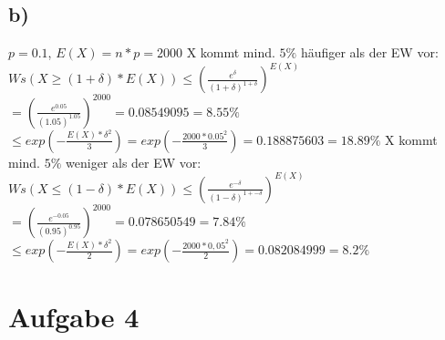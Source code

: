 \documentclass[a4paper,10pt,oneside,leqno]{scrartcl}
\begin{document}
\subsection*{b)}
$p = 0.1$, $E(X) = n*p = 2000$\newline
X kommt mind. $5\%$ häufiger als der EW vor:\newline
$Ws(X \geq (1+\delta) * E(X)) \leq (\frac{e^{\delta}}{(1+\delta)^{1+\delta}})^{E(X)}$\newline
$=(\frac{e^{0.05}}{(1.05)^{1.05}})^{2000} = 0.08549095 = 8.55\%$\newline
$\leq exp(-\frac{E(X)*\delta^2}{3}) = exp(-\frac{2000*0.05^2}{3}) = 0.188875603 = 18.89\%$\newline \newline
X kommt mind. $5\%$ weniger als der EW vor:\newline
$Ws(X \leq (1-\delta) * E(X)) \leq (\frac{e^{-\delta}}{(1-\delta)^{1+-\delta}})^{E(X)}$\newline
$=(\frac{e^{-0.05}}{(0.95)^{0.95}})^{2000} = 0.078650549 = 7.84\%$\newline
$\leq exp(-\frac{E(X)*\delta^2}{2}) = exp(-\frac{2000*0,05^2}{2}) = 0.082084999 = 8.2\%$\newline

\section*{Aufgabe 4}%
\end{document}
